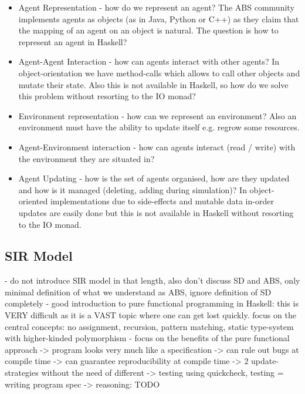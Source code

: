 \begin{itemize}
	\item Agent Representation - how do we represent an agent? The ABS community implements agents as objects (as in Java, Python or C++) as they claim that the mapping of an agent on an object is natural. The question is how to represent an agent in Haskell?
	\item Agent-Agent Interaction - how can agents interact with other agents? In object-orientation we have method-calls which allows to call other objects and mutate their state. Also this is not available in Haskell, so how do we solve this problem without resorting to the IO monad?
	\item Environment representation - how can we represent an environment? Also an environment must have the ability to update itself e.g. regrow some resources.
	\item Agent-Environment interaction - how can agents interact (read / write) with the environment they are situated in?
	\item Agent Updating - how is the set of agents organised, how are they updated and how is it managed (deleting, adding during simulation)? In object-oriented implementations due to side-effects and mutable data in-order updates are easily done but this is not available in Haskell without resorting to the IO monad.
\end{itemize}

\subsection{SIR Model}
- do not introduce SIR model in that length, also don't discuss SD and ABS, only minimal definition of what we understand as ABS, ignore definition of SD completely
- good introduction to pure functional programming in Haskell: this is VERY difficult as it is a VAST topic where one can get lost quickly. focus on the central concepts: no assignment, recursion, pattern matching, static type-system with higher-kinded polymorphism
- focus on the benefits of the pure functional approach
	-> program looks very much like a specification
	-> can rule out bugs at compile time
	-> can guarantee reproducibility at compile time
	-> 2 update-strategies without the need of different
	-> testing using quickcheck, testing = writing program spec
	-> reasoning: TODO

